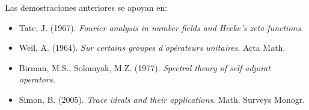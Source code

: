 \begin{remark}
Las demostraciones anteriores se apoyan en:
\begin{itemize}
\item Tate, J. (1967). \emph{Fourier analysis in number fields and Hecke's zeta-functions}.
\item Weil, A. (1964). \emph{Sur certains groupes d'opérateurs unitaires}. Acta Math.
\item Birman, M.S., Solomyak, M.Z. (1977). \emph{Spectral theory of self-adjoint operators}.
\item Simon, B. (2005). \emph{Trace ideals and their applications}. Math. Surveys Monogr.
\end{itemize}
\end{remark}
